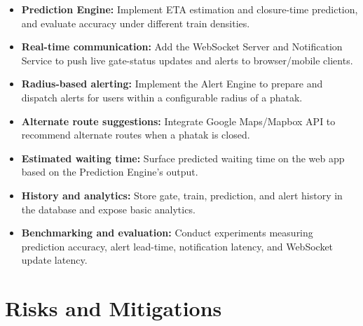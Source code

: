\documentclass[11pt,a4paper]{article}
\begin{document}
\begin{itemize}
    \item \textbf{Prediction Engine:} Implement ETA estimation and closure-time prediction, and evaluate accuracy under different train densities.

    \item \textbf{Real-time communication:} Add the WebSocket Server and Notification Service to push live gate-status updates and alerts to browser/mobile clients.

    \item \textbf{Radius-based alerting:} Implement the Alert Engine to prepare and dispatch alerts for users within a configurable radius of a phatak.

    \item \textbf{Alternate route suggestions:} Integrate Google Maps/Mapbox API to recommend alternate routes when a phatak is closed.

    \item \textbf{Estimated waiting time:} Surface predicted waiting time on the web app based on the Prediction Engine's output.

    \item \textbf{History and analytics:} Store gate, train, prediction, and alert history in the database and expose basic analytics.

    \item \textbf{Benchmarking and evaluation:} Conduct experiments measuring prediction accuracy, alert lead-time, notification latency, and WebSocket update latency.
\end{itemize}

\section{Risks and Mitigations}
\end{document}
